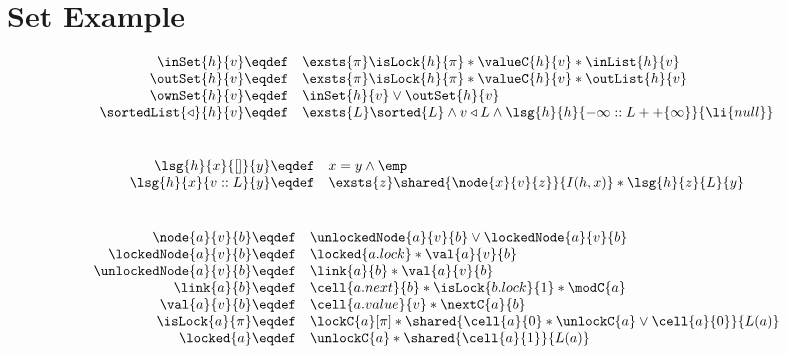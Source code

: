 \section*{Set Example}
%
%
\[
\begin{array}{r l}
	\inSet{h}{v} \eqdef & \exsts{\pi} \isLock{h}{\pi} * \valueC{h}{v} * \inList{h}{v}\\
	\outSet{h}{v} \eqdef & \exsts{\pi} \isLock{h}{\pi} * \valueC{h}{v} * \outList{h}{v}\\
	\ownSet{h}{v} \eqdef & \inSet{h}{v} \lor \outSet{h}{v}\\
	\sortedList{\triangleleft}{h}{v} \eqdef & \exsts{L} \sorted{L} \land v  \triangleleft L \land \lsg{h}{h}{-\infty:: L ++ \{\infty\} }{\li{null}}\\
%
\end{array}
\]\\
%
%
\[
\begin{array}{r l}
	
	\lsg{h}{x}{[]}{y} \eqdef & x = y \land \emp\\
	\lsg{h}{x}{v:: L}{y} \eqdef & \exsts{z} \shared{\node{x}{v}{z}}{I(h, x)} * \lsg{h}{z}{L}{y}
\end{array}
\]\\
%
%
\[	
\begin{array}{r l}
	\node{a}{v}{b} \eqdef & \unlockedNode{a}{v}{b} \lor \lockedNode{a}{v}{b}\\ %
	\lockedNode{a}{v}{b} \eqdef & \locked{a.lock} * \val{a}{v}{b}\\
	\unlockedNode{a}{v}{b} \eqdef & \link{a}{b} * \val{a}{v}{b}\\
	
	\link{a}{b} \eqdef & \cell{a.next}{b} * \isLock{b.lock}{1} * \modC{a} \\
	\val{a}{v}{b} \eqdef & \cell{a.value}{v} * \nextC{a}{b}\\
	
	\isLock{a}{\pi} \eqdef & \lockC{a}[\pi] * \shared{\cell{a}{0} * \unlockC{a} \lor \cell{a}{0}}{L(a)}\\
	\locked{a} \eqdef & \unlockC{a} * \shared{\cell{a}{1}}{L(a)}\\
\end{array}
\]\\
